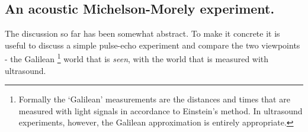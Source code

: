 \documentclass[10pt, fleqn,final,showtrims,oldfontcommands, article,a4paper,oneside]{memoir} %
\newcommand{\secref}[1]{section~\ref{sec:#1}}
\newcommand{\tm}{\tau^-}
\newcommand{\tp}{\tau^+}
\begin{document}
\subsection{An acoustic Michelson-Morely  experiment.}

The discussion so far has been somewhat abstract.
To make it concrete it is useful to discuss a simple pulse-echo experiment and  compare the two viewpoints
- the Galilean%
\footnote{Formally the `Galilean' measurements are the distances and times that are  measured with light signals in accordance to Einstein's method\cite{Einstein1905}.
In ultrasound experiments, however, the Galilean approximation is entirely appropriate.}
 world that is {\em seen}, with the world that is measured with ultrasound. %
%







\end{document}
